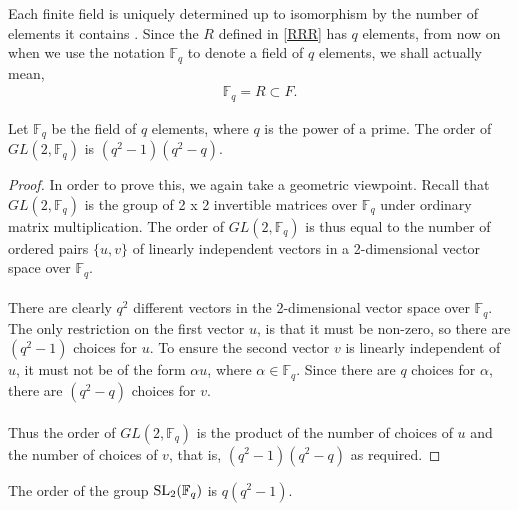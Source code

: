 Each finite field is uniquely determined up to isomorphism by the number of elements it contains \cite[p.227]{stewart}. Since the $R$ defined in \eqref{RRR} has $q$ elements, from now on when we use the notation $\mathbb{F}_q$ to denote a field of $q$ elements, we shall actually mean,
\begin{align}
    \label{subfield} \mathbb{F}_q = R \subset F.
\end{align}

\begin{lemma}
    Let $\mathbb{F}_q$ be the field of $q$ elements, where $q$ is the power of a prime. The order of $GL(2,\mathbb{F}_q)$ is $(q^2-1)(q^2-q)$.
\end{lemma}
\begin{proof}
    In order to prove this, we again take a geometric viewpoint. Recall that $GL(2,\mathbb{F}_q)$ is the group of 2 x 2 invertible matrices over $\mathbb{F}_q$ under ordinary matrix multiplication. The order of $GL(2,\mathbb{F}_q)$ is thus equal to the number of ordered pairs $\{u,v\}$ of linearly independent vectors in a 2-dimensional vector space over $\mathbb{F}_q$. \\
    \\
    There are clearly $q^2$ different vectors in the 2-dimensional vector space over $\mathbb{F}_q$. The only restriction on the first vector $u$, is that it must be non-zero, so there are $(q^2 - 1)$ choices for $u$. To ensure the second vector $v$ is linearly independent of $u$, it must not be of the form $\alpha u$, where $\alpha \in \mathbb{F}_q$. Since there are $q$ choices for $\alpha$, there are $(q^2-q)$ choices for $v$. \\
    \\
    Thus the order of $GL(2,\mathbb{F}_q)$ is the product of the number of choices of $u$ and the number of choices of $v$, that is, $(q^2-1)(q^2-q)$ as required.
\end{proof}

\begin{lemma}
\label{card_SL_field}
\leanok
The order of the group $\operatorname{SL}_2(\mathbb{F}_q)$ is $q(q^2-1)$.
\end{lemma}

